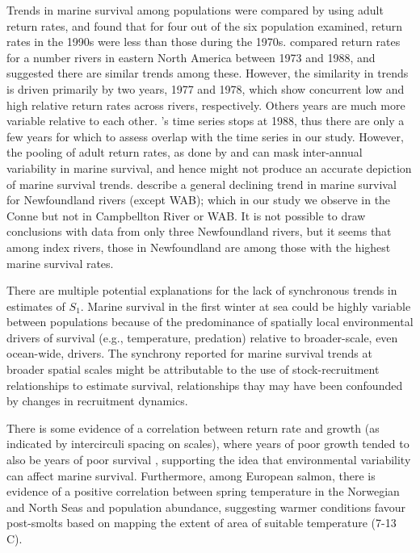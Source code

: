 \documentclass[12pt]{article}
\newcommand{\So}{$S_{1}$\xspace}
\begin{document}
Trends in marine survival
among populations were compared by \citet{Chaput2012a} using adult return rates, 
and found that for four out of the six population examined, return rates in the 1990s 
were less than those during the 1970s.
\citet{Friedland1993} compared return rates for a number rivers in eastern
North America between 1973 and 1988, and suggested there are similar trends among these. 
However, the similarity in trends is driven primarily by two years, 1977 and 1978, which
show concurrent low and high relative return rates across rivers,
respectively. Others years are much more variable relative to each other.
\citeauthor{Friedland1993}'s \citeyear{Friedland1993} time series stops at
1988, thus there are only a few years for which to assess overlap with the
time series in our study.
However, the pooling of adult return rates, as done by \citet{Chaput2012a} and
\citet{Friedland1993} can mask inter-annual variability in marine survival,
and hence might not produce an accurate depiction of marine survival trends.
\citet{Dempson2003} describe a general declining trend in marine survival for
Newfoundland rivers (except WAB); which in our study we observe in the
Conne but not in Campbellton River or WAB. It is not possible to draw conclusions
with data from only three Newfoundland rivers, but it seems that among index rivers,
those in Newfoundland are among those with the highest marine survival rates.

There are multiple potential explanations for the lack of synchronous
trends in estimates of \So. 
Marine survival in the first winter at sea could be highly variable between
populations because of the predominance of spatially local environmental drivers of survival (e.g., temperature, predation) 
relative to broader-scale, even ocean-wide, drivers.
The synchrony reported for marine survival trends at broader spatial scales \citep{Olmos2019}
might be attributable to the use of stock-recruitment relationships to estimate survival,
relationships thay may have been confounded by changes in recruitment dynamics.

There is some evidence of a correlation between return rate and growth (as
indicated by intercirculi spacing on scales), where years of poor growth
tended to also be years of poor survival \citep{Friedland1993}, supporting the
idea that environmental variability can affect marine survival.
Furthermore, among European salmon, there is evidence of a positive correlation
between spring temperature in the Norwegian and North Seas and population abundance, suggesting warmer
conditions favour post-smolts \citep{Friedland1998} based on mapping the
extent of area of suitable temperature (7-13 \textdegree C).
\end{document}
